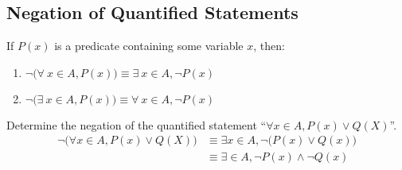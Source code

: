 \documentclass[\main/notes.tex]{subfiles}
\begin{document}
			\subsection{Negation of Quantified Statements}
				If $P(x)$ is a predicate containing some variable $x$, then:
				\begin{enumerate}
					\item $\lnot \bigl(\forall \: x \in A, P(x)\bigr) \equiv \exists \: x \in A, \lnot P(x)$
					\item $\lnot \bigl(\exists \: x \in A, P(x)\bigr) \equiv \forall \: x \in A, \lnot P(x)$
				\end{enumerate}
			\begin{example}
				Determine the negation of the quantified statement ``$\forall x \in A, P(x) \lor Q(X)$''.
				\begin{align*}
					\lnot \bigl(\forall x \in A, P(x) \lor Q(X)\bigr) &\equiv \exists x \in A, \lnot \bigl(P(x) \lor Q(x)\bigr)\\
					& \equiv \exists \in A, \lnot P(x) \land \lnot Q(x)
				\end{align*}
			\end{example}
			\pagebreak
\end{document}
